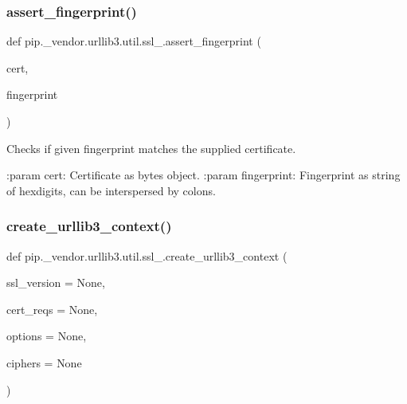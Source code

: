 \mbox{\label{namespacepip_1_1__vendor_1_1urllib3_1_1util_1_1ssl___a43a95083f42fbbe38b44cd5d72bd7431}} 
\subsubsection{\texorpdfstring{assert\+\_\+fingerprint()}{assert\_fingerprint()}}
{\footnotesize\ttfamily def pip.\+\_\+vendor.\+urllib3.\+util.\+ssl\+\_\+.\+assert\+\_\+fingerprint (\begin{DoxyParamCaption}\item[{}]{cert,  }\item[{}]{fingerprint }\end{DoxyParamCaption})}

\begin{DoxyVerb}Checks if given fingerprint matches the supplied certificate.

:param cert:
    Certificate as bytes object.
:param fingerprint:
    Fingerprint as string of hexdigits, can be interspersed by colons.
\end{DoxyVerb}
 \mbox{\label{namespacepip_1_1__vendor_1_1urllib3_1_1util_1_1ssl___a5fdbb8af803306826d3389e1ca033ce2}} 
\subsubsection{\texorpdfstring{create\+\_\+urllib3\+\_\+context()}{create\_urllib3\_context()}}
{\footnotesize\ttfamily def pip.\+\_\+vendor.\+urllib3.\+util.\+ssl\+\_\+.\+create\+\_\+urllib3\+\_\+context (\begin{DoxyParamCaption}\item[{}]{ssl\+\_\+version = {\ttfamily None},  }\item[{}]{cert\+\_\+reqs = {\ttfamily None},  }\item[{}]{options = {\ttfamily None},  }\item[{}]{ciphers = {\ttfamily None} }\end{DoxyParamCaption})}

